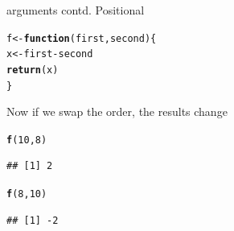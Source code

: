 \documentclass{beamer}\usepackage[]{graphicx}\usepackage[]{color}
\makeatletter
\newcommand{\hlnum}[1]{\textcolor[rgb]{0.686,0.059,0.569}{#1}}%
\newcommand{\hlopt}[1]{\textcolor[rgb]{0,0,0}{#1}}%
\newcommand{\hlstd}[1]{\textcolor[rgb]{0.345,0.345,0.345}{#1}}%
\newcommand{\hlkwa}[1]{\textcolor[rgb]{0.161,0.373,0.58}{\textbf{#1}}}%
\newcommand{\hlkwb}[1]{\textcolor[rgb]{0.69,0.353,0.396}{#1}}%
\newcommand{\hlkwc}[1]{\textcolor[rgb]{0.333,0.667,0.333}{#1}}%
\newcommand{\hlkwd}[1]{\textcolor[rgb]{0.737,0.353,0.396}{\textbf{#1}}}%
\newenvironment{kframe}{%
 \def\at@end@of@kframe{}%
 \ifinner\ifhmode%
  \def\at@end@of@kframe{\end{minipage}}%
  \begin{minipage}{\columnwidth}%
 \fi\fi%
 \def\FrameCommand##1{\hskip\@totalleftmargin \hskip-\fboxsep
 \colorbox{shadecolor}{##1}\hskip-\fboxsep
     \hskip-\linewidth \hskip-\@totalleftmargin \hskip\columnwidth}%
 \MakeFramed {\advance\hsize-\width
   \@totalleftmargin\z@ \linewidth\hsize
   \@setminipage}}%
 {\par\unskip\endMakeFramed%
 \at@end@of@kframe}
\newenvironment{knitrout}{}{} %
\makeatother
\begin{document}
\begin{frame}[fragile]{arguments contd.}
Positional
\linebreak
\begin{knitrout}
\color{fgcolor}\begin{kframe}
\begin{alltt}
\hlstd{f} \hlkwb{<-} \hlkwa{function}\hlstd{(}\hlkwc{first}\hlstd{,} \hlkwc{second}\hlstd{) \{}
    \hlstd{x} \hlkwb{<-} \hlstd{first} \hlopt{-} \hlstd{second}
    \hlkwd{return}\hlstd{(x)}
\hlstd{\}}
\end{alltt}
\end{kframe}
\end{knitrout}

Now if we swap the order, the results change
\begin{knitrout}
\color{fgcolor}\begin{kframe}
\begin{alltt}
\hlkwd{f}\hlstd{(}\hlnum{10}\hlstd{,} \hlnum{8}\hlstd{)}
\end{alltt}
\begin{verbatim}
## [1] 2
\end{verbatim}
\begin{alltt}
\hlkwd{f}\hlstd{(}\hlnum{8}\hlstd{,} \hlnum{10}\hlstd{)}
\end{alltt}
\begin{verbatim}
## [1] -2
\end{verbatim}
\end{kframe}
\end{knitrout}

\end{frame}
\end{document}
